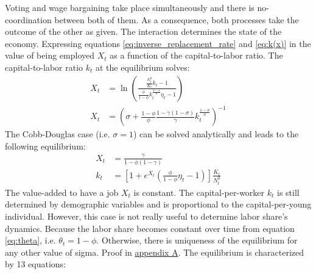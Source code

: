 Voting and wage bargaining take place simultaneously and there is no-coordination between both of them. As a consequence, both processes take the outcome of the other as given. The interaction determines the state of the economy. Expressing equations \eqref{eq:inverse_replacement_rate} and \eqref{eq:k(x)} in the value of being employed $X_t$ as a function of the capital-to-labor ratio. The capital-to-labor ratio $k_t$ at the equilibrium solves:
\begin{align}
	\label{eq:Xg} 
	X_t &= \ln\left( \frac{ \frac{N_t^y}{K_t} k_t - 1 } { \frac{\phi}{1-\phi} k_t^{\frac{\sigma-1}{\sigma}} \eta_t - 1 }\right) \\
	\label{eq:Xh}
	X_t &= \left( \sigma + \frac{1-\phi}{\phi} \frac{1-\gamma(1-\sigma)}{\gamma} k_t^{\frac{1-\sigma}{\sigma}} \right)^{-1} 
\end{align}
The Cobb-Douglas case (i.e. $\sigma = 1$) can be solved analytically and leads to the following equilibrium:
\begin{align*}
	X_t &= \frac{\gamma}{1-\phi(1-\gamma)} \\
	k_t &= \left[1 + e^{X_t}\left(\frac{\phi}{1-\phi}\eta_t-1\right)\right]\frac{K_t}{N_t^y}
\end{align*}
The value-added to have a job $X_t$ is constant. The capital-per-worker $k_t$ is still determined by demographic variables and is proportional to the capital-per-young individual. However, this case is not really useful to determine labor share's dynamics. Because the labor share becomes constant over time from equation \eqref{eq:theta}, i.e. $\theta_t = 1-\phi$. Otherwise, there is uniqueness of the equilibrium for any other value of sigma. Proof in \hyperref[appendix:uniqueness]{appendix A}. The equilibrium is characterized by 13 equations:

